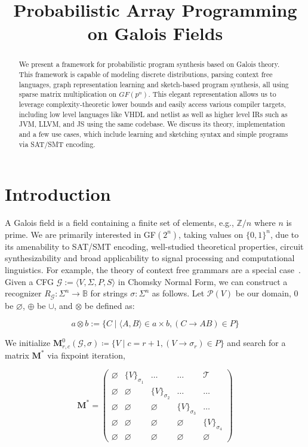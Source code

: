 \documentclass[sigplan,10pt,review,anonymous]{acmart}
\begin{document}
\title{Probabilistic Array Programming on Galois Fields}
\begin{abstract}
We present a framework for probabilistic program synthesis based on Galois theory. This framework is capable of modeling discrete distributions, parsing context free languages, graph representation learning and sketch-based program synthesis, all using sparse matrix multiplication on $GF(p^n)$. This elegant representation allows us to leverage complexity-theoretic lower bounds and easily access various compiler targets, including low level languages like VHDL and netlist as well as higher level IRs such as JVM, LLVM, and JS using the same codebase. We discuss its theory, implementation and a few use cases, which include learning and sketching syntax and simple programs via SAT/SMT encoding.
\end{abstract}
\maketitle

\section{Introduction}

A Galois field is a field containing a finite set of elements, e.g., $\mathbb{Z}/n$ where $n$ is prime. We are primarily interested in GF$(2^n)$, taking values on $\{0, 1\}^n$, due to its amenability to SAT/SMT encoding, well-studied theoretical properties, circuit synthesizability and broad applicability to signal processing and computational linguistics. For example, the theory of context free grammars are a special case~\citep{jansson2016certified, bakinova2020formal}. Given a CFG $\mathcal{G} := \langle V, \Sigma, P, S\rangle$ in Chomsky Normal Form, we can construct a recognizer $R_\mathcal{G}: \Sigma^n \rightarrow \mathbb{B}$ for strings $\sigma: \Sigma^n$ as follows. Let $\mathcal P(V)$ be our domain, $0$ be $\varnothing$, $\oplus$ be $\cup$, and $\otimes$ be defined as:

\vspace{-7pt}
\[
a \otimes b := \{C \mid \langle A, B\rangle \in a \times b, (C\rightarrow AB) \in P\}
\]

\noindent We initialize $\mathbf{M}^0_{r,c}(\mathcal{G}, \sigma) \coloneqq \{V \mid c = r + 1, (V \rightarrow \sigma_r) \in P\}$ and search for a matrix $\mathbf{M}^*$ via fixpoint iteration,

\vspace{-5}
\[
\mathbf{M}^* = \begin{pmatrix}
            \varnothing & \{V\}_{\sigma_1} & \ldots & \ldots & \mathcal{T} \\
            \varnothing & \varnothing & \{V\}_{\sigma_2} & \ldots & \ldots \\
            \varnothing & \varnothing & \varnothing & \{V\}_{\sigma_3} & \ldots \\
            \varnothing & \varnothing & \varnothing & \varnothing & \{V\}_{\sigma_4} \\
            \varnothing & \varnothing & \varnothing & \varnothing & \varnothing
\end{pmatrix}
\]
\end{document}
